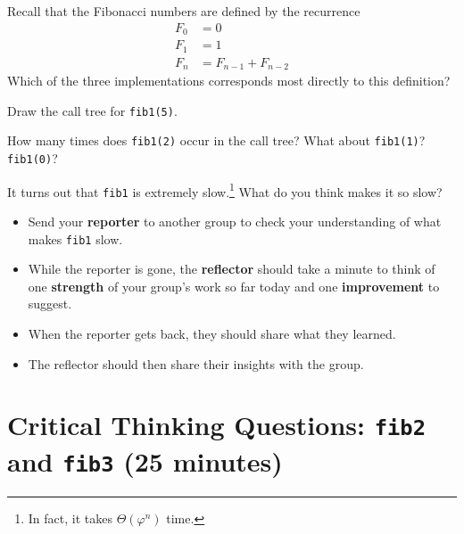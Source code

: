 \documentclass{tufte-handout}
\begin{document}
\begin{questions}
\item Recall that the Fibonacci numbers are defined by the recurrence
  \begin{align*}
    F_0 &= 0 \\ F_1 &= 1 \\ F_n &= F_{n-1} + F_{n-2}
  \end{align*}
  Which of the three implementations corresponds most directly to
  this definition?
\item Draw the call tree for \verb|fib1(5)|. \vspace{1in}
\item How many times does \verb|fib1(2)| occur in the call tree?
  What about \verb|fib1(1)|?  \verb|fib1(0)|?
\item It turns out that \verb|fib1| is extremely slow.\footnote{In
    fact, it takes $\Theta(\varphi^n)$ time.}  What do you think makes
  it so slow?
\end{questions}

  \begin{fullwidth}
  \begin{mdframed}
    \begin{itemize}
    \item Send your \textbf{reporter} to another group to check your
      understanding of what makes \verb|fib1| slow.
    \item While the reporter is gone, the \textbf{reflector} should
      take a minute to think of one \textbf{strength} of your group's
      work so far today and one \textbf{improvement} to suggest.
    \item When the reporter gets back, they should share what they
      learned.
    \item The reflector should then share their insights with the
      group.
    \end{itemize}
  \end{mdframed}
  \end{fullwidth}
\pause

\section{Critical Thinking Questions: \texttt{fib2} and \texttt{fib3}
  (25 minutes)}
\end{document}
